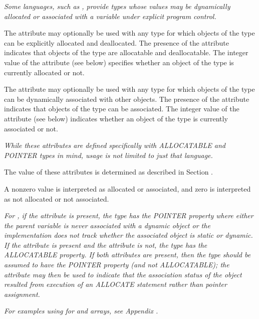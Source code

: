 \textit{Some languages, such as ,
provide types whose values
may be dynamically allocated or associated with a variable
under explicit program control.}

\hypertarget{chap:DWATallocatedallocationstatusoftypes}{}
The 
\DWATallocated{} 
attribute 
may optionally be used with any
type for which objects of the type can be explicitly allocated
and deallocated. The presence of the attribute indicates that
objects of the type are allocatable and deallocatable. The
integer value of the attribute (see below) specifies whether
an object of the type is 
currently allocated or not.

\hypertarget{chap:DWATassociatedassociationstatusoftypes}{}
The 
\DWATassociated{} attribute 
may 
optionally be used with
any type for which objects of the type can be dynamically
associated with other objects. The presence of the attribute
indicates that objects of the type can be associated. The
integer value of the attribute (see below) indicates whether
an object of the type is currently associated or not.

\textit{While these attributes are defined specifically with 
 ALLOCATABLE and POINTER types
in mind, usage is not limited
to just that language.}

The value of these attributes is determined as described in
Section .

A non\dash zero value is interpreted as allocated or associated,
and zero is interpreted as not allocated or not associated.

\textit{For , 
if the \DWATassociated{} 
attribute is present,
the type has the POINTER property where either the parent
variable is never associated with a dynamic object or the
implementation does not track whether the associated object
is static or dynamic. If the \DWATallocated{} attribute is
present and the \DWATassociated{} attribute is not, the type
has the ALLOCATABLE property. If both attributes are present,
then the type should be assumed to have the POINTER property
(and not ALLOCATABLE); the \DWATallocated{} attribute may then
be used to indicate that the association status of the object
resulted from execution of an ALLOCATE statement rather than
pointer assignment.}

\textit{For examples using 
\DWATallocated{} for  and 
arrays, 
see Appendix .}

